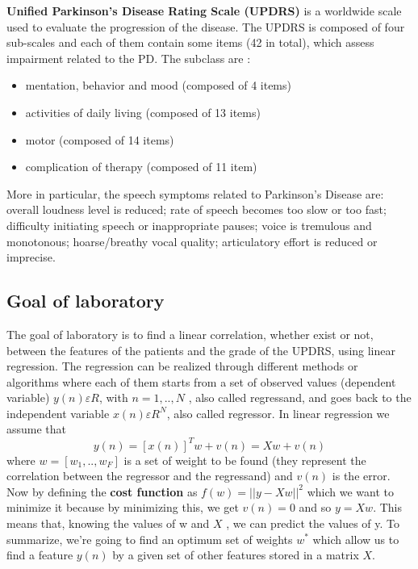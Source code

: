\documentclass[a4paper,12pt,oneside,titlepage]{article}
\begin{document}
	\textbf{Unified Parkinson’s Disease Rating Scale (UPDRS)} is a worldwide scale used to evaluate the progression of the disease. The UPDRS is composed of four sub-scales and each of them contain some items (42 in total), which assess impairment related to the PD. The subclass are : 
	\begin{itemize}
		\item mentation, behavior and mood (composed of 4 items)
		\item activities of daily living (composed of 13 items)
		\item motor (composed of 14 items)
		\item complication of therapy (composed of 11 item)
	\end{itemize}
	More in particular, the speech symptoms related to Parkinson’s Disease are: overall loudness level is reduced; rate of speech becomes too slow or too fast; difficulty initiating speech or inappropriate pauses; voice is tremulous and monotonous; hoarse/breathy vocal quality; articulatory effort is reduced or imprecise.
	
	\subsection{Goal of laboratory}
	The goal of laboratory is to find a linear correlation, whether exist or not, between the features of the patients and the grade of the UPDRS, using linear regression. The regression can be realized through different methods or algorithms where each of them starts from a set of observed values (dependent variable) $y(n)  \varepsilon R$, with $n = 1, ..,N$ , also called regressand, and goes back to the independent variable $x(n)  \varepsilon R^{N}$, also called regressor. In linear regression we assume that
	\begin{equation}
	y(n) = [x (n)]^T w + v(n) = Xw + v(n)
	\end{equation}
	where $w = [w_{1}, ..,w_{F}]$ is a set of weight to be found (they represent the correlation between the regressor and the regressand) and $v(n)$ is the error.
	Now by defining the \textbf{cost function} as $f(w) = ||y-Xw||^2$ which we want to minimize it because by minimizing this, we get $v(n) = 0$ and so $y = Xw$. This means that, knowing the values of w and $X$ , we can predict the values of y. To summarize, we’re going to find an optimum set of weights $w^*$ which allow us to find a feature $y(n)$ by a given set of other features stored in a matrix $X$.
	
	\newpage
\end{document}
